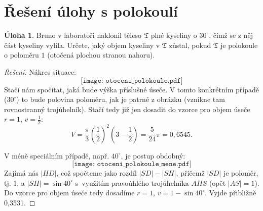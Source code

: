 \documentclass[10pt,a4paper]{extarticle}
\theoremstyle{definition}
\newtheorem*{uloha}{\atr Úloha}
\def\atr{}
\begin{document}
\section*{Řešení úlohy s polokoulí}


\begin{uloha}
Bruno v laboratoři naklonil těleso $\mathfrak T$ plné kyseliny o $30^\circ$, čímž se z něj část kyseliny vylila. Určete, jaký objem kyseliny v $\mathfrak T$ zůstal, pokud $\mathfrak T$ je
polokoule o poloměru $1$ (otočená plochou stranou nahoru).
\end{uloha}

\begin{proof}[Řešení]
Nákres situace:
\[ \texttt{[image: otoceni\_polokoule.pdf]} \]
Stačí nám spočítat, jaká bude výška příslušné úseče. V tomto konkrétním případě ($30^\circ$) to bude polovina poloměru, jak je patrné z obrázku (vznikne tam rovnostranný trojúhelník). Stačí tedy již jen dosadit do vzorce pro objem úseče $r = 1$, $v = \frac12$:
\[ V = \frac\pi3 \left(\frac12\right)^2 \left(3 - \frac12\right) = \frac{5}{24}\pi \doteq 0,6545. \]

V méně speciálním případě, např. $40^\circ$, je postup obdobný:
\[ \texttt{[image: otoceni\_polokoule\_mene.pdf]} \]
Zajímá nás $|HD|$, což spočteme jako rozdíl $|SD| - |SH|$, přičemž $|SD|$ je poloměr, tj. 1, a $|SH| = \sin 40^\circ$ s~využitím pravoúhlého trojúhelníka $AHS$ (opět $|AS| = 1$). Do vzorce pro objem úseče tedy dosadíme $r = 1$, $v = 1 - \sin 40^\circ$. Vyjde přibližně 0,3531.
\end{proof}
\end{document}
